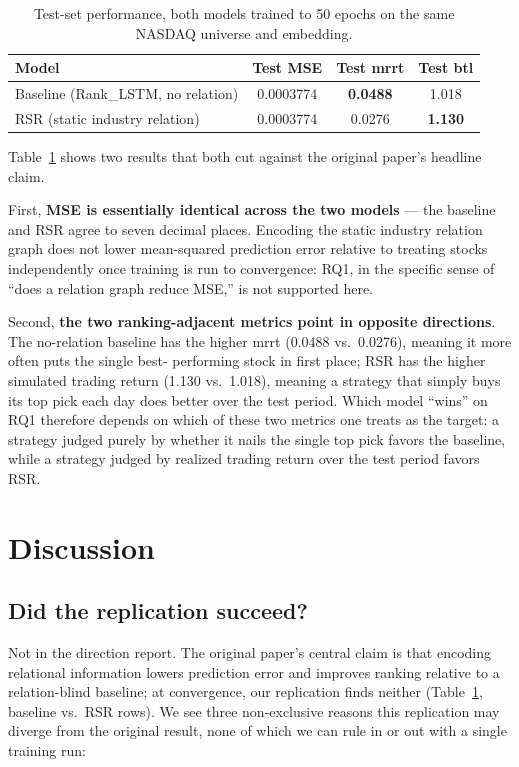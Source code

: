 \documentclass[11pt]{article}
\begin{document}
\begin{table}[h]
\centering
\caption{Test-set performance, both models trained to 50 epochs on the same NASDAQ universe
and embedding.}
\label{tab:results50}
\begin{tabular}{lccc}
\toprule
Model & Test MSE & Test mrrt & Test btl \\
\midrule
Baseline (Rank\_LSTM, no relation) & 0.0003774 & \textbf{0.0488} & 1.018 \\
RSR (static industry relation) & 0.0003774 & 0.0276 & \textbf{1.130} \\
\bottomrule
\end{tabular}
\end{table}

Table~\ref{tab:results50} shows two results that both cut against the original paper's headline
claim.

First, \textbf{MSE is essentially identical across the two models} --- the baseline and RSR agree
to seven decimal places. Encoding the static industry relation graph does not lower mean-squared
prediction error relative to treating stocks independently once training is run to convergence:
RQ1, in the specific sense of ``does a relation graph reduce MSE,'' is not supported here.

Second, \textbf{the two ranking-adjacent metrics point in opposite directions}. The no-relation
baseline has the higher mrrt (0.0488 vs.\ 0.0276), meaning it more often puts the single best-
performing stock in first place; RSR has the higher simulated trading return (1.130 vs.\ 1.018),
meaning a strategy that simply buys its top pick each day does better over the test period. Which
model ``wins'' on RQ1 therefore depends on which of these two metrics one treats as the target: a
strategy judged purely by whether it nails the single top pick favors the baseline, while a
strategy judged by realized trading return over the test period favors RSR.

\section{Discussion}
\label{sec:discussion}

\subsection{Did the replication succeed?}

Not in the direction \citet{feng2019temporal} report. The original paper's central claim is that
encoding relational information lowers prediction error and improves ranking relative to a
relation-blind baseline; at convergence, our replication finds neither (Table~\ref{tab:results50},
baseline vs.\ RSR rows). We see three non-exclusive reasons this replication may diverge from the
original result, none of which we can rule in or out with a single training run:
\end{document}
